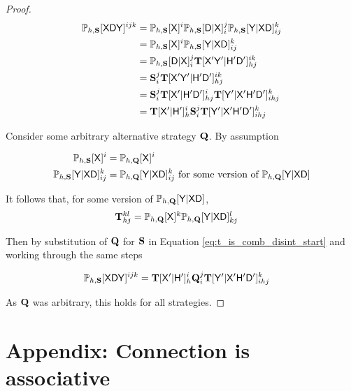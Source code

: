 \begin{proof}
\begin{align}
    \mathbb{P}_{h,\mathbf{S}}[\mathsf{XDY}]^{ijk} &= \mathbb{P}_{h,\mathbf{S}}[\mathsf{X}]^i\mathbb{P}_{h,\mathbf{S}}[\mathsf{D}|\mathsf{X}]_i^{j} \mathbb{P}_{h,\mathbf{S}}[\mathsf{Y}|\mathsf{XD}]_{ij}^{k}\label{eq:t_is_comb_disint_start}\\
     &=  \mathbb{P}_{h,\mathbf{S}}[\mathsf{X}]^i\mathbb{P}_{h,\mathbf{S}}[\mathsf{Y}|\mathsf{XD}]_{ij}^{k}\\
     &= \mathbb{P}_{h,\mathbf{S}}[\mathsf{D}|\mathsf{X}]_i^{j} \mathbf{T}[\mathsf{X'Y'}|\mathsf{H'D'}]_{hj}^{ik}\\
     &= \mathbf{S}_i^j \mathbf{T}[\mathsf{X'Y'}|\mathsf{H'D'}]_{hj}^{ik}\\
     &= \mathbf{S}_i^j \mathbf{T}[\mathsf{X'}|\mathsf{H'D'}]_{hj}^{i} \mathbf{T}[\mathsf{Y'}|\mathsf{X'H'D'}]_{ihj}^k\\
     &= \mathbf{T}[\mathsf{X'}|\mathsf{H'}]_{h}^{i} \mathbf{S}_i^j  \mathbf{T}[\mathsf{Y'}|\mathsf{X'H'D'}]_{ihj}^k\label{eq:t_is_comb_disint_end}
\end{align}

Consider some arbitrary alternative strategy $\mathbf{Q}$. By assumption

\begin{align}
    \mathbb{P}_{h,\mathbf{S}}[\mathsf{X}]^{i} &= \mathbb{P}_{h,\mathbf{Q}}[\mathsf{X}]^{i}\\
    \mathbb{P}_{h,\mathbf{S}}[\mathsf{Y}|\mathsf{XD}]_{ij}^k &= \mathbb{P}_{h,\mathbf{Q}}[\mathsf{Y}|\mathsf{XD}]_{ij}^k\text{ for some version of }\mathbb{P}_{h,\mathbf{Q}}[\mathsf{Y}|\mathsf{XD}]
\end{align}

It follows that, for some version of $\mathbb{P}_{h,\mathbf{Q}}[\mathsf{Y}|\mathsf{XD}]$,
\begin{align}
    \mathbf{T}_{hj}^{kl} &= \mathbb{P}_{h,\mathbf{Q}}[\mathsf{X}]^k \mathbb{P}_{h,\mathbf{Q}}[\mathsf{Y}|\mathsf{X}\mathsf{D}]^l_{kj} \label{eq:comb_disint_nonuniq}
\end{align}

Then by substitution of $\mathbf{Q}$ for $\mathbf{S}$ in Equation \ref{eq:t_is_comb_disint_start} and working through the same steps

\begin{align}
    \mathbb{P}_{h,\mathbf{S}}[\mathsf{XDY}]^{ijk} &= \mathbf{T}[\mathsf{X'}|\mathsf{H'}]_{h}^{i} \mathbf{Q}_i^j  \mathbf{T}[\mathsf{Y'}|\mathsf{X'H'D'}]_{ihj}^k
\end{align}

As $\mathbf{Q}$ was arbitrary, this holds for all strategies.
\end{proof}

\section{Appendix: Connection is associative}\label{sec:connect_associative}

